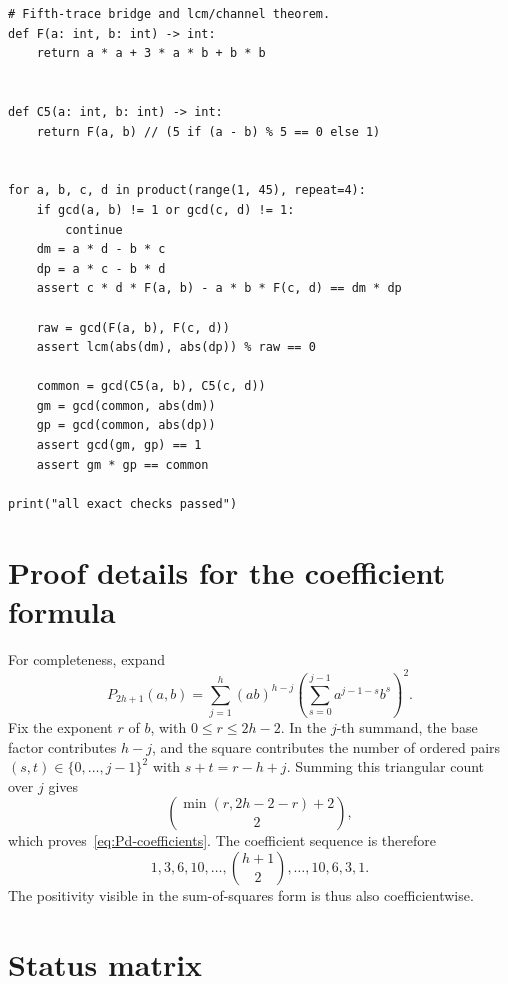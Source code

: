 \documentclass[11pt,oneside]{article}
\theoremstyle{definition}
\theoremstyle{remark}
\begin{document}
\begin{lstlisting}[style=pythonstyle,caption={Exact centered-trace verifier.}]
# Fifth-trace bridge and lcm/channel theorem.
def F(a: int, b: int) -> int:
    return a * a + 3 * a * b + b * b


def C5(a: int, b: int) -> int:
    return F(a, b) // (5 if (a - b) % 5 == 0 else 1)


for a, b, c, d in product(range(1, 45), repeat=4):
    if gcd(a, b) != 1 or gcd(c, d) != 1:
        continue
    dm = a * d - b * c
    dp = a * c - b * d
    assert c * d * F(a, b) - a * b * F(c, d) == dm * dp

    raw = gcd(F(a, b), F(c, d))
    assert lcm(abs(dm), abs(dp)) % raw == 0

    common = gcd(C5(a, b), C5(c, d))
    gm = gcd(common, abs(dm))
    gp = gcd(common, abs(dp))
    assert gcd(gm, gp) == 1
    assert gm * gp == common

print("all exact checks passed")
\end{lstlisting}

\section{Proof details for the coefficient formula}
\label{app:coefficients}

For completeness, expand
\[
 P_{2h+1}(a,b)=\sum_{j=1}^{h}(ab)^{h-j}
 \left(\sum_{s=0}^{j-1}a^{j-1-s}b^s\right)^2.
\]
Fix the exponent \(r\) of \(b\), with \(0\le r\le2h-2\).  In the \(j\)-th summand, the
base factor contributes \(h-j\), and the square contributes the number of ordered pairs
\((s,t)\in\{0,\ldots,j-1\}^2\) with
\(s+t=r-h+j\).  Summing this triangular count over \(j\) gives
\[
 \binom{\min(r,2h-2-r)+2}{2},
\]
which proves~\eqref{eq:Pd-coefficients}.  The coefficient sequence is therefore
\[
 1,3,6,10,\ldots,\binom{h+1}{2},\ldots,10,6,3,1.
\]
The positivity visible in the sum-of-squares form is thus also coefficientwise.

\section{Status matrix}
\label{app:status}
\end{document}

